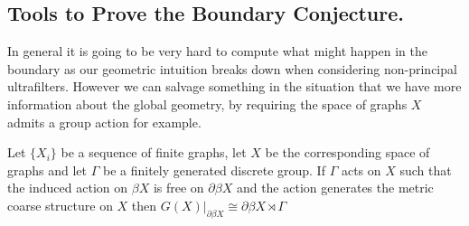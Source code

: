 \subsection{Tools to Prove the Boundary Conjecture.}
In general it is going to be very hard to compute what might happen in the boundary as our geometric intuition breaks down when considering non-principal ultrafilters. However we can salvage something in the situation that we have more information about the global geometry, by requiring the space of graphs $X$ admits a group action for example.

\begin{proposition}\label{Prop:Crit}
Let $\lbrace X_{i} \rbrace$ be a sequence of finite graphs, let $X$ be the corresponding space of graphs and let $\Gamma$ be a finitely generated discrete group. If $\Gamma$ acts on $X$ such that the induced action on $\beta X$ is free on $\partial \beta X$ and the action generates the metric coarse structure on $X$ then $G(X)|_{\partial \beta X} \cong \partial \beta X \rtimes \Gamma$
\end{proposition}
